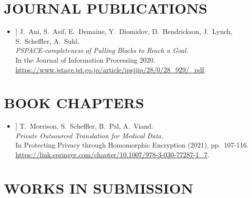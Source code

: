\documentclass{res}
\begin{document}
\begin{resume}
\vspace{0.25in}

\section{JOURNAL PUBLICATIONS}
\vspace{0.25in}

\newcommand{\pullingblocksJIP}{[11]\xspace}

\begin{itemize}
\item[\pullingblocksJIP] J.~Ani, S.~Asif, E.~Demaine, Y.~Diomidov, D.~Hendrickson, J.~Lynch, S.~Scheffler, A.~Suhl. \\
\emph{PSPACE-completeness of Pulling Blocks to Reach a Goal.} \\
In the Journal of Information Processing 2020.\\
\url{https://www.jstage.jst.go.jp/article/ipsjjip/28/0/28_929/_pdf}.
\end{itemize}

\vspace{0.25in}

\section{BOOK CHAPTERS}
\vspace{0.25in}

\newcommand{\privateTranslation}{[12]\xspace}

\begin{itemize}
\item[\privateTranslation] T.~Morrison, S.~Scheffler, B.~Pal, A.~Viand. \\
\emph{Private Outsourced Translation for Medical Data.} \\
In Protecting Privacy through Homomorphic Encryption (2021), pp.~107-116. \\
\url{https://link.springer.com/chapter/10.1007/978-3-030-77287-1_7}.
\end{itemize}

\vspace{0.25in}

\section{WORKS IN SUBMISSION}
\vspace{0.25in}

\newcommand{\csamimprovements}{[13]\xspace}
\newcommand{\eeesok}{[14]\xspace}


\end{resume}
\end{document}
